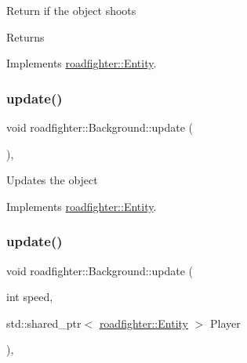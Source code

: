 Return if the object shoots \begin{DoxyReturn}{Returns}

\end{DoxyReturn}


Implements \hyperlink{classroadfighter_1_1Entity_ad0ecaa0539db252e591da83814251509}{roadfighter\+::\+Entity}.

\mbox{\label{classroadfighter_1_1Background_a6fa762ca6aa2f18918c1b715ae94395f}} 
\subsubsection{\texorpdfstring{update()}{update()}\hspace{0.1cm}{\footnotesize\ttfamily [1/2]}}
{\footnotesize\ttfamily void roadfighter\+::\+Background\+::update (\begin{DoxyParamCaption}{ }\end{DoxyParamCaption})\hspace{0.3cm}{\ttfamily [override]}, {\ttfamily [virtual]}}

Updates the object 

Implements \hyperlink{classroadfighter_1_1Entity_a19cd353f12a3e8432acd6d5609137561}{roadfighter\+::\+Entity}.

\mbox{\label{classroadfighter_1_1Background_a881ed4d9e98e86ce7128c0fd18f82160}} 
\subsubsection{\texorpdfstring{update()}{update()}\hspace{0.1cm}{\footnotesize\ttfamily [2/2]}}
{\footnotesize\ttfamily void roadfighter\+::\+Background\+::update (\begin{DoxyParamCaption}\item[{int}]{speed,  }\item[{std\+::shared\+\_\+ptr$<$ \hyperlink{classroadfighter_1_1Entity}{roadfighter\+::\+Entity} $>$}]{Player }\end{DoxyParamCaption})\hspace{0.3cm}{\ttfamily [override]}, {\ttfamily [virtual]}}

